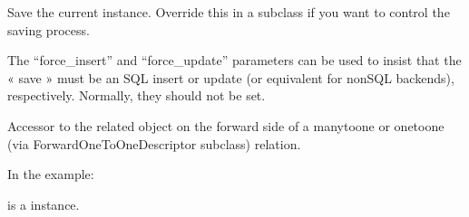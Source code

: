 \documentclass[letterpaper,10pt,french]{sphinxmanual}
\begin{document}
\begin{fulllineitems}

\begin{fulllineitems}
\label{\detokenize{main/model:main.models.Programme.save}}
\pysigstartsignatures
{}
\pysigstopsignatures
\sphinxAtStartPar
Save the current instance. Override this in a subclass if you want to
control the saving process.

\sphinxAtStartPar
The “force\_insert” and “force\_update” parameters can be used to insist
that the « save » must be an SQL insert or update (or equivalent for
non\sphinxhyphen{}SQL backends), respectively. Normally, they should not be set.

\end{fulllineitems}


\begin{fulllineitems}
\label{\detokenize{main/model:main.models.Programme.semestre}}
\pysigstartsignatures
{}
\pysigstopsignatures
\sphinxAtStartPar
Accessor to the related object on the forward side of a many\sphinxhyphen{}to\sphinxhyphen{}one or
one\sphinxhyphen{}to\sphinxhyphen{}one (via ForwardOneToOneDescriptor subclass) relation.

\sphinxAtStartPar
In the example:

\begin{sphinxVerbatim}[commandchars=\\\{\}]
 
       
\end{sphinxVerbatim}

\sphinxAtStartPar
{} is a  instance.

\end{fulllineitems}



\end{fulllineitems}
\end{document}
